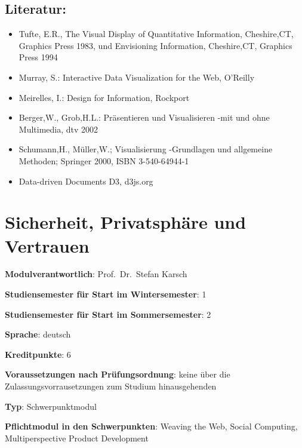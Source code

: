 \section*{Literatur:}\label{literatur-18}

\begin{itemize}
\tightlist
\item
  Tufte, E.R., The Visual Display of Quantitative Information,
  Cheshire,CT, Graphics Press 1983, und Envisioning Information,
  Cheshire,CT, Graphics Press 1994
\item
  Murray, S.: Interactive Data Visualization for the Web, O'Reilly
\item
  Meirelles, I.: Design for Information, Rockport
\item
  Berger,W., Grob,H.L.: Präsentieren und Visualisieren -mit und ohne
  Multimedia, dtv 2002
\item
  Schumann,H., Müller,W.; Visualisierung -Grundlagen und allgemeine
  Methoden; Springer 2000, ISBN 3-540-64944-1
\item
  Data-driven Documents D3, d3js.org
\end{itemize}

\chapter{Sicherheit, Privatsphäre und
Vertrauen}\label{sicherheit-privatsphuxe4re-und-vertrauen}

\begin{modulHead}
\textbf{Modulverantwortlich}: Prof.~Dr.~Stefan
Karsch
\end{modulHead}
\begin{modulHead}
\textbf{Studiensemester für
Start im Wintersemester}:
1
\end{modulHead}
\begin{modulHead}
\textbf{Studiensemester für Start
im Sommersemester}:
2
\end{modulHead}
\begin{modulHead}
\textbf{Sprache}:
deutsch
\end{modulHead}
\begin{modulHead}
\textbf{Kreditpunkte}:
6
\end{modulHead}
\begin{modulHead}
\textbf{Voraussetzungen nach
Prüfungsordnung}: keine über die Zulassungsvorrausetzungen zum Studium
hinausgehenden
\end{modulHead}
\begin{modulHead}
\textbf{Typ}:
Schwerpunktmodul
\end{modulHead}
\begin{modulHead}
\textbf{Pflichtmodul
in den Schwerpunkten}: Weaving the Web, Social Computing,
Multiperspective Product Development
\end{modulHead}



